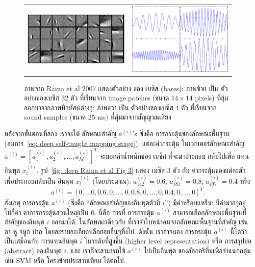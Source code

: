 %
\begin{figure}
\begin{center}
\begin{tabular}{cc}
\includegraphics[width=2.5in]{04SelfTaught/RainaEtAlFig2a.png} 
& 
\includegraphics[width=2.5in]{04SelfTaught/RainaEtAlFig2b.png}
\end{tabular} 
\end{center}
\caption{ภาพจาก Raina et al 2007 แสดงตัวอย่าง ของ เบซิส (bases):
ภาพซ้าย เป็น ตัวอย่างของเบซิส 32 ตัว ที่เรียนจาก image patches (ขนาด $14 \times 14$ pixels) ที่สุ่มออกมาจากภาพทิวทัศน์ต่างๆ;
ภาพขวา เป็น ตัวอย่างของเบซิส 4 ตัว ที่เรียนจาก sound samples (ขนาด 25 ms) ที่สุ่มมาจากสัญญาณเสียง}
\label{fig: deep Raina et al Fig 2}
\end{figure}
%

หลังจากขั้นตอนที่สอง เราจะได้ ลักษณะสำคัญ $a^{(i)}$'s ซึ่งคือ การกระตุ้นของลักษณะพื้นฐาน (สมการ~\ref{eq: deep self-taught mapping stage}).
แต่ละค่ากระตุ้น ในเวกเตอร์ลักษณะสำคัญ $a^{(i)} = [a^{(i)}_1, a^{(i)}_2, \ldots, a^{(i)}_M]^T$ จะบอกค่าน้ำหนักของ เบซิส ที่จะมาประกอบ กลับไปเพื่อ แทน อินพุต $x_l^{(i)}$.
รูป~\ref{fig: deep Raina et al Fig 3} แสดง เบซิส 3 ตัว กับ ค่ากระตุ้นของแต่ละตัว เพื่อประกอบกลับเป็น อินพุต $x_l^{(i)}$ (โดยประมาณ):
$a_{142}^{(i)} = 0.6$, $a_{381}^{(i)} = 0.8$, $a_{497}^{(i)} = 0.4$ หรือ 
\begin{eqnarray}
a^{(i)} = 
[0, \ldots 0, 0.6, 0, \ldots, 0, 0.8, 0, \ldots, 0, 0.4, 0, \ldots, 0]^T
\nonumber .
\end{eqnarray}
สังเกตุ การกระตุ้น $a^{(i)}$ (ซึ่งคือ ``ลักษณะสำคัญของอินพุตตัวที่ $i$'') มีค่าหร็อมแหร็ม: มีค่ามากๆอยู่ไม่กี่ค่า ค่าการกระตุ้นส่วนใหญ่เป็น $0$.
นี่คือ การที่ การกระตุ้น $a^{(i)}$ สามารถเลือกลักษณะพื้นฐานที่สำคัญของอินพุต $i$ ออกมาได้.
ในลักษณะเดียวกับ ที่เราจำใบหน้าคนจากลักษณะพื้นฐานที่สำคัญ เช่น ตา หู จมูก ปาก โดยละรายละเอียดปลีกย่อยอื่นๆทิ้งไป.
%
ดังนั้น เราอาจมอง การกระตุ้น $a^{(i)}$ นี้ได้ว่า เป็นเสมือนกับ การแทนอินพุต $i$ ในระดับที่สูงขึ้น (higher level representation) หรือ การสรุปย่อ (abstract) ของอินพุต $i$.
และ เราก็จะสามารถใช้ $a^{(i)}$ ไปเป็นอินพุต ของอัลกอริทึ่มเพื่อจำแนกกลุ่ม เช่น SVM หรือ โครงข่ายประสาทเทียม ได้ต่อไป.

